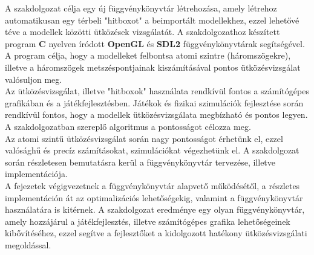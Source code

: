 
A szakdolgozat célja egy új függvénykönyvtár létrehozása, amely létrehoz automatikusan egy térbeli "hitboxot" a beimportált modellekhez, ezzel lehetővé téve a modellek közötti ütközések vizsgálatát. A szakdolgozathoz készített program \textbf{C} nyelven íródott \textbf{OpenGL} és \textbf{SDL2} függvénykönyvtárak segítségével. A program célja, hogy a modelleket felbontsa atomi szintre (háromszögekre), illetve a háromszögek metszéspontjainak kiszámításával pontos ütközésvizsgálat valósuljon meg.\\

Az ütközésvizsgálat, illetve "hitboxok" használata rendkívül fontos a számítógépes grafikában és a játékfejlesztésben. Játékok és fizikai szimulációk fejlesztése során rendkívül fontos, hogy a modellek ütközésvizsgálata megbízható és pontos legyen. A szakdolgozatban szereplő algoritmus a pontosságot célozza meg.\\

Az atomi szintű ütközésvizsgálat során nagy pontosságot érhetünk el, ezzel valósághű és precíz számításokat, szimulációkat végezhetünk el. A szakdolgozat során részletesen bemutatásra kerül a függvénykönyvtár tervezése, illetve implementációja.\\

A fejezetek végigvezetnek a függvénykönyvtár alapvető működésétől, a részletes implementáción át az optimalizációs lehetőségekig, valamint a függvénykönyvtár használatára is kitérnek. A szakdolgozat eredménye egy olyan függvénykönyvtár, amely hozzájárul a játékfejlesztés, illetve számítógépes grafika lehetőségeinek kibővítéséhez, ezzel segítve a fejlesztőket a kidolgozott hatékony ütközésvizsgálati megoldással.